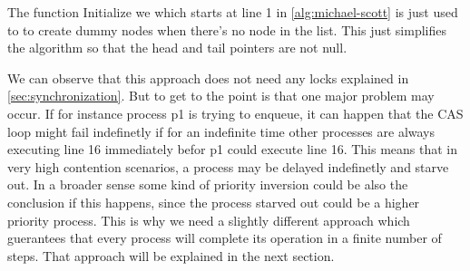 The function Initialize we which starts at line 1 in \cref{alg:michael-scott} is just used to to create dummy nodes when there's no node in the list. This just simplifies the algorithm so that the head and tail pointers are not null. \cite{MichaelScottQueue}

We can observe that this approach does not need any locks explained in \cref{sec:synchronization}. But to get to the point is that one major problem may occur. If for instance process p1 is trying to enqueue, it can happen that the \ac{CAS} loop might fail indefinetly if for an indefinite time other processes are always executing line 16 immediately befor p1 could execute line 16. This means that in very high contention scenarios, a process may be delayed indefinetly and starve out. In a broader sense some kind of priority inversion could be also the conclusion if this happens, since the process starved out could be a higher priority process. This is why we need a slightly different approach which guerantees that every process will complete its operation in a finite number of steps. That approach will be explained in the next section. \cite{MichaelScottQueue}

